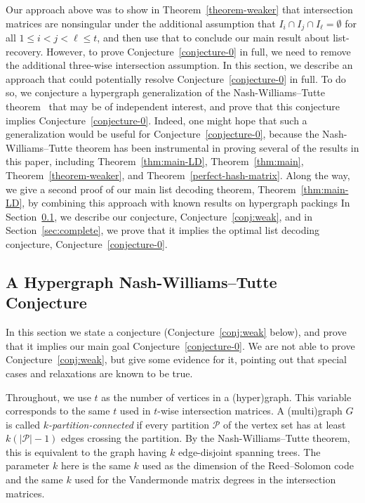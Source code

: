 \documentclass[11pt]{article}
\begin{document}
Our approach above was to show in Theorem~\ref{theorem-weaker} that intersection matrices are nonsingular under the additional assumption that $I_i \cap I_j \cap I_\ell = \emptyset$ for all $1\le i < j < \ell\le t$, and then use that to conclude our main result about list-recovery.
However, to prove Conjecture~\ref{conjecture-0} in full, we need to remove the additional three-wise intersection assumption.
In this section, we describe an approach that could potentially resolve Conjecture~\ref{conjecture-0} in full.
To do so, we conjecture a hypergraph generalization of the Nash-Williams--Tutte theorem~\cite{nash1961edge,tutte1961problem} that may be of independent interest, and prove that this conjecture implies Conjecture~\ref{conjecture-0}.
Indeed, one might hope that such a generalization would be useful for Conjecture~\ref{conjecture-0}, because the Nash-Williams--Tutte theorem has been instrumental in proving several of the results in this paper, including Theorem~\ref{thm:main-LD}, Theorem~\ref{thm:main}, Theorem~\ref{theorem-weaker}, and Theorem~\ref{perfect-hash-matrix}.
Along the way, we give a second proof of our main list decoding theorem, Theorem~\ref{thm:main-LD}, by combining this approach with known results on hypergraph packings \cite{CS07, CCV09}
In Section~\ref{subsec:intro-hyp}, we describe our conjecture, Conjecture~\ref{conj:weak}, and in Section~\ref{sec:complete}, we prove that it implies the optimal list decoding conjecture, Conjecture~\ref{conjecture-0}.





\subsection{A Hypergraph Nash-Williams--Tutte Conjecture}
\label{subsec:intro-hyp}
In this section we state a conjecture (Conjecture~\ref{conj:weak} below), and prove that it implies our main goal Conjecture~\ref{conjecture-0}.
We are not able to prove Conjecture~\ref{conj:weak}, but give some evidence for it, pointing out that special cases and relaxations are known to be true.




Throughout, we use $t$ as the number of vertices in a (hyper)graph.
This variable corresponds to the same $t$ used in $t$-wise intersection matrices.
A (multi)graph $G$ is called {\it $k$-partition-connected} if every partition $\mathcal{P}$ of the vertex set has at least $k(|\mathcal{P}|-1)$ edges crossing the partition.
By the Nash-Williams--Tutte theorem, this is equivalent to the graph having $k$ edge-disjoint spanning trees.
The parameter $k$ here is the same $k$ used as the dimension of the Reed--Solomon code and the same $k$ used for the Vandermonde matrix degrees in the intersection matrices.
\end{document}
